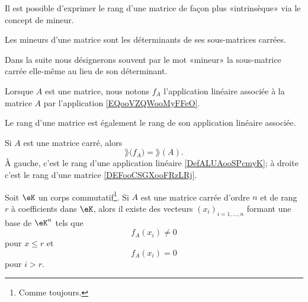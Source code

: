 Il est possible d'exprimer le rang d'une matrice de façon plus «intrinsèque» via le concept de mineur.
\begin{definition}
    Les mineurs d'une matrice sont les déterminants de ses sous-matrices carrées.
\end{definition}
Dans la suite nous désignerons souvent par le mot «mineur» la sous-matrice carrée elle-même au lieu de son déterminant.

Lorsque \( A\) est une matrice, nous notons \( f_A\) l'application linéaire associée à la matrice \( A\) par l'application \eqref{EQooVZQWooMyFFeO}.

Le rang d'une matrice est également le rang de son application linéaire associée.
\begin{proposition}[Rang]       \label{PROPooCINLooFGNtwS}
    Si \( A\) est une matrice carré, alors
    \begin{equation}
        \rang\big( f_A \big)=\rang(A).
    \end{equation}
    À gauche, c'est le rang d'une application linéaire \ref{DefALUAooSPcmyK}; à droite c'est le rang d'une matrice \ref{DEFooCSGXooFRzLRj}.
\end{proposition}

\begin{lemma} \label{LEMVecsaRgFixe}
    Soit \( \eK \) un corps commutatif\footnote{Comme toujours.}. Si \( A \) est une matrice carrée d'ordre \( n \) et de rang \( r \) à coefficients dans \( \eK \), alors il existe des vecteurs \( (x_i)_{i=1,\dots,n} \) formant une base de \( \eK^n \) tels que 
    \begin{equation}
        f_A(x_i)\neq 0
    \end{equation}
    pour \( x\leq r\) et
    \begin{equation}
        f_A(x_i) = 0
    \end{equation}
    pour \( i > r \).
\end{lemma}

